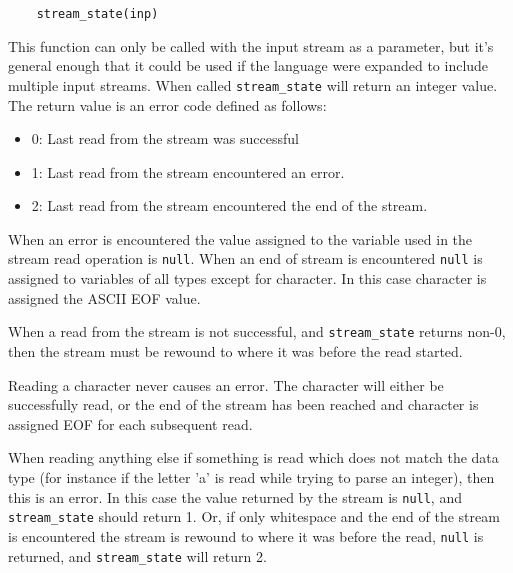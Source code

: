 \documentclass[../../gazprea.tex]{subfiles}
\begin{document}
\begin{lstlisting}
	stream_state(inp)
\end{lstlisting}

This function can only be called with the input stream as a parameter, but it's general enough that it could be
used if the language were expanded to include multiple input streams.
When called \texttt{stream\_state} will return an integer value. The return value is an error code defined as
follows:
\begin{itemize}
	\item 0: Last read from the stream was successful
	\item 1: Last read from the stream encountered an error.
	\item 2: Last read from the stream encountered the end of the stream.
\end{itemize}

When an error is encountered the value assigned to the variable used in the stream read operation is
\texttt{null}. When an end of stream is encountered \texttt{null} is assigned to variables of all types except
for character. In this case character is assigned the ASCII EOF value.

When a read from the stream is not successful, and \texttt{stream\_state} returns non-0, then the stream must be
rewound to where it was before the read started.

Reading a character never causes an error. The character will either be successfully read, or the end of the
stream has been reached and character is assigned EOF for each subsequent read.

When reading anything else if something is read which does not match the data type (for instance if the letter
'a' is read while trying to parse an integer), then this is an error. In this case the value returned by the
stream is \texttt{null}, and \texttt{stream\_state} should return 1. Or, if only whitespace and the end of the
stream is encountered the stream is rewound to where it was before the read, \texttt{null} is returned, and
\texttt{stream\_state} will return 2.
\end{document}
